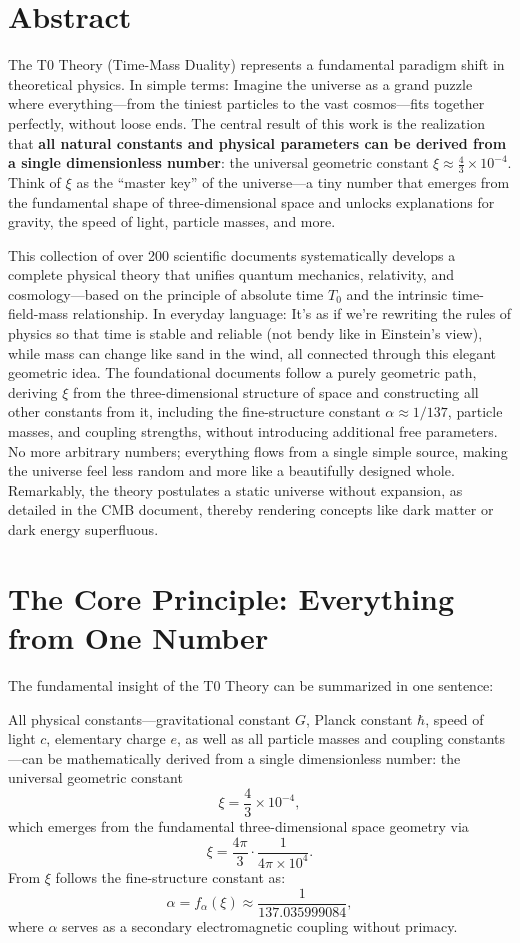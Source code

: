 \section*{Abstract}
		The T0 Theory (Time-Mass Duality) represents a fundamental paradigm shift in theoretical physics. In simple terms: Imagine the universe as a grand puzzle where everything—from the tiniest particles to the vast cosmos—fits together perfectly, without loose ends. The central result of this work is the realization that \textbf{all natural constants and physical parameters can be derived from a single dimensionless number}: the universal geometric constant $\xi \approx \frac{4}{3} \times 10^{-4}$. Think of $\xi$ as the ``master key'' of the universe—a tiny number that emerges from the fundamental shape of three-dimensional space and unlocks explanations for gravity, the speed of light, particle masses, and more.
		
		This collection of over 200 scientific documents systematically develops a complete physical theory that unifies quantum mechanics, relativity, and cosmology—based on the principle of absolute time $T_0$ and the intrinsic time-field-mass relationship. In everyday language: It's as if we're rewriting the rules of physics so that time is stable and reliable (not bendy like in Einstein's view), while mass can change like sand in the wind, all connected through this elegant geometric idea. The foundational documents follow a purely geometric path, deriving $\xi$ from the three-dimensional structure of space and constructing all other constants from it, including the fine-structure constant $\alpha \approx 1/137$, particle masses, and coupling strengths, without introducing additional free parameters. No more arbitrary numbers; everything flows from a single simple source, making the universe feel less random and more like a beautifully designed whole. Remarkably, the theory postulates a static universe without expansion, as detailed in the CMB document, thereby rendering concepts like dark matter or dark energy superfluous.

	
	\section{The Core Principle: Everything from One Number}
	
	The fundamental insight of the T0 Theory can be summarized in one sentence:
	
	\begin{keyresult}
		All physical constants—gravitational constant $G$, Planck constant $\hbar$, speed of light $c$, elementary charge $e$, as well as all particle masses and coupling constants—can be mathematically derived from a single dimensionless number: the universal geometric constant
		\[
		\xi = \frac{4}{3} \times 10^{-4},
		\]
		which emerges from the fundamental three-dimensional space geometry via
		\[
		\xi = \frac{4\pi}{3} \cdot \frac{1}{4\pi \times 10^4}.
		\]
		From $\xi$ follows the fine-structure constant as:
		\[
		\alpha = f_\alpha(\xi) \approx \frac{1}{137.035999084},
		\]
		where $\alpha$ serves as a secondary electromagnetic coupling without primacy.
	\end{keyresult}
	
